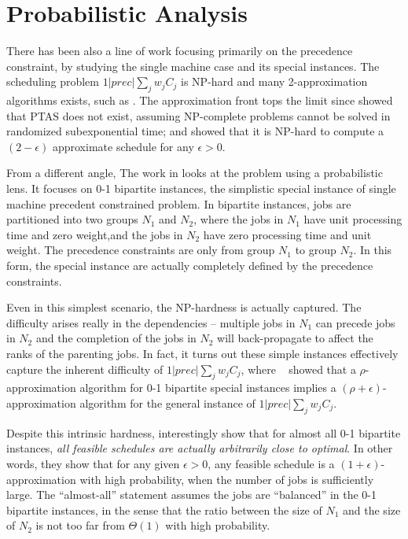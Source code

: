 \section{Probabilistic Analysis} \label{s:bism}
There has been also a line of work focusing primarily on the precedence constraint, by studying the single machine case and its special instances. The scheduling problem $1|prec|\sum_jw_jC_j$ is NP-hard and many 2-approximation algorithms exists, such as \cite{hall1997scheduling}. The approximation front tops the limit since \cite{ambuhl2007inapproximability} showed that PTAS does not exist, assuming NP-complete problems cannot be solved in randomized subexponential time; and \cite{bansal2009optimal} showed that it is NP-hard to compute a $(2-\epsilon)$ approximate schedule for any $\epsilon> 0$. 

From a different angle, The work in \cite{schulz2011near} looks at the problem using a probabilistic lens. It focuses on 0-1 bipartite instances, the simplistic special instance of single machine precedent constrained problem. In bipartite instances, jobs are partitioned into two groups $N_1$ and $N_2$, where the jobs in $N_1$ have unit processing time and zero weight,and the jobs in $N_2$ have zero processing time and unit weight. The precedence constraints are only from group $N_1$ to group $N_2$. In this form, the special instance are  actually completely defined by the precedence constraints.

Even in this simplest scenario, the NP-hardness is actually captured. The difficulty arises really in the dependencies -- multiple jobs in $N_1$ can precede jobs in $N_2$ and the completion of the jobs in $N_2$ will back-propagate to affect the ranks of the parenting jobs. In fact, it turns out these simple instances effectively capture the inherent difficulty of $1|prec|\sum_jw_jC_j$, where ~\cite{woeginger2003approximability} showed that a $\rho$-approximation algorithm for 0-1 bipartite special instances implies a $(\rho+\epsilon)$-approximation algorithm for the general instance of $1|prec|\sum_jw_jC_j$.

Despite this intrinsic hardness, \cite{schulz2011near} interestingly show that for almost all 0-1 bipartite instances, \emph{all feasible schedules are actually arbitrarily close to optimal}. In other words, they show that for any given $\epsilon > 0$, any feasible schedule is a  $(1 + \epsilon)$-approximation with high probability, when the number of jobs is sufficiently large. The ``almost-all'' statement assumes the jobs are “balanced” in the 0-1 bipartite instances, in the sense that the ratio between the size of $N_1$ and the size of $N_2$ is not too far from $\Theta(1)$ with high probability.

